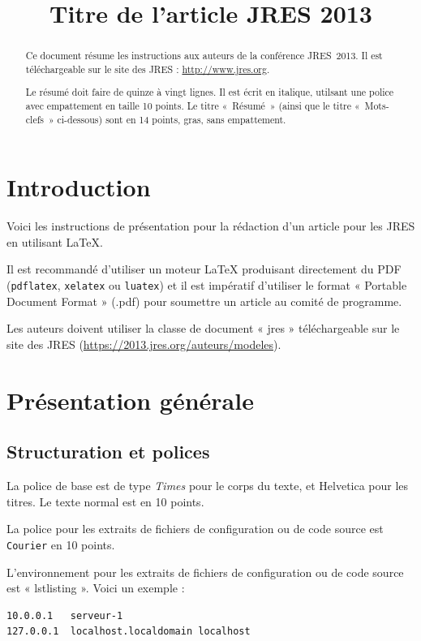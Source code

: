 \documentclass[city=Montpellier,year=2013]{jres}
\title{Titre de l'article JRES 2013}
\begin{document}
\maketitle

\begin{abstract}
Ce document résume les instructions aux auteurs de la conférence JRES~2013.
Il est téléchargeable sur le site des JRES : \url{http://www.jres.org}.

Le résumé doit faire de quinze à vingt lignes. Il est écrit en italique,
utilsant une police avec empattement en taille 10 points.
Le titre « Résumé » (ainsi que le titre « Mots-clefs » ci-dessous)
sont en 14 points, gras, sans empattement.
\end{abstract}


\section{Introduction}

Voici les instructions de présentation pour la rédaction d'un article
pour les JRES en utilisant \LaTeX{}.

Il est recommandé d'utiliser un moteur \LaTeX{} produisant directement
du PDF (\texttt {pdflatex}, \texttt {xelatex} ou \texttt {luatex}) et il est
impératif d'utiliser le format « Portable Document Format » (.pdf) pour
soumettre un article au comité de programme.

Les auteurs doivent utiliser la classe de document « jres » téléchargeable
sur le site des JRES (\url{https://2013.jres.org/auteurs/modeles}).

\section{Présentation générale}

\subsection{Structuration et polices}

La police de base est de type \emph{Times} pour le corps du texte, et
\textsf{Helvetica} pour les titres.
Le texte  normal est en 10 points.

La police pour les extraits de fichiers de configuration ou de code
source est \texttt{Courier} en 10 points.

L'environnement pour les extraits de fichiers de configuration ou
de code source  est « lstlisting ». Voici un exemple :
\vspace{2ex}
\begin{lstlisting}
10.0.0.1   serveur-1
127.0.0.1  localhost.localdomain localhost
\end{lstlisting}
\end{document}
